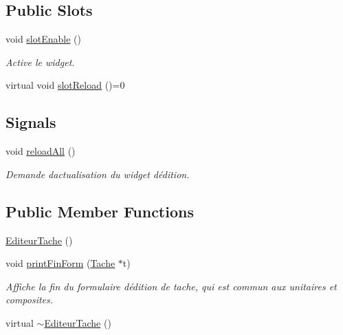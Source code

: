 \subsection*{Public Slots}
\begin{DoxyCompactItemize}
\item 
void \hyperlink{class_editeur_tache_a3da47f10289e4a6d06a758e15b9cf75b}{slot\+Enable} ()
\begin{DoxyCompactList}\small\item\em Active le widget. \end{DoxyCompactList}\item 
virtual void \hyperlink{class_editeur_tache_a74d5b6312857eb3eb906d91e62120117}{slot\+Reload} ()=0
\end{DoxyCompactItemize}
\subsection*{Signals}
\begin{DoxyCompactItemize}
\item 
void \hyperlink{class_editeur_tache_adf24ca27b5a0b0280b83c3f73d4e6bfa}{reload\+All} ()
\begin{DoxyCompactList}\small\item\em Demande d\textquotesingle{}actualisation du widget d\textquotesingle{}édition. \end{DoxyCompactList}\end{DoxyCompactItemize}
\subsection*{Public Member Functions}
\begin{DoxyCompactItemize}
\item 
\hyperlink{class_editeur_tache_af009a1d4c96dab70e199d53060f039e0}{Editeur\+Tache} ()
\item 
void \hyperlink{class_editeur_tache_a6f5dab1963119064dc44f0ec27dd2d59}{print\+Fin\+Form} (\hyperlink{class_tache}{Tache} $\ast$t)
\begin{DoxyCompactList}\small\item\em Affiche la fin du formulaire d\textquotesingle{}édition de tache, qui est commun aux unitaires et composites. \end{DoxyCompactList}\item 
virtual \hyperlink{class_editeur_tache_a68ce9a1be85d6ed5f27414fbc776080b}{$\sim$\+Editeur\+Tache} ()
\end{DoxyCompactItemize}
